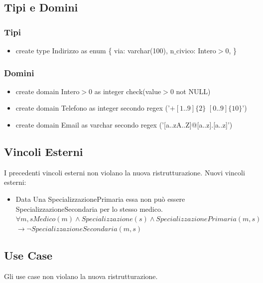 \documentclass[12pt, letterpaper]{article}
\begin{document}
\newpage
\subsection{Tipi e Domini}
\subsubsection{Tipi}
\begin{itemize}
    
    \item create type Indirizzo as enum \{
        via: varchar(100),
        n$\_$civico: Intero$>$0,
    \}

\end{itemize}
\subsubsection{Domini}
\begin{itemize}
    \item create domain Intero$>$0 as integer check(value$>$0 not NULL)
    \item create domain Telefono as integer secondo regex ('$+[1..9]\{2\}$ $[0..9]\{10\}$')
    \item create domain Email as varchar secondo regex ('[a..zA..Z]@[a..z].[a..z]') 
\end{itemize}
\subsection{Vincoli Esterni}
I precedenti vincoli esterni non violano la nuova ristrutturazione.
Nuovi vincoli esterni:
\begin{itemize}
    \item Data Una SpecializzazionePrimaria essa non può essere SpecializzazioneSecondaria per lo stesso medico.\\
        $\forall m, s Medico(m) \land Specializzazione(s) \land SpecializzazionePrimaria(m,s)$\\ $\rightarrow \lnot SpecializzazioneSecondaria(m,s)$
\end{itemize}
\subsection{Use Case}
Gli use case non violano la nuova ristrutturazione.
\newpage
\end{document}

